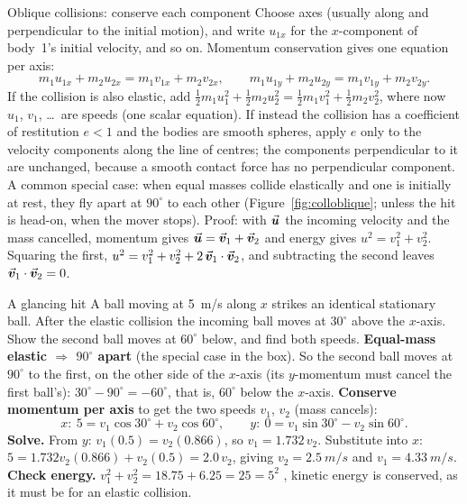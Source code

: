 \begin{methodbox}{Oblique collisions: conserve each component}
Choose axes (usually along and perpendicular to the initial motion), and write $u_{1x}$ for the
$x$-component of body~1's initial velocity, and so on. Momentum conservation gives one equation per axis:
\[
m_1u_{1x}+m_2u_{2x}=m_1v_{1x}+m_2v_{2x},\qquad m_1u_{1y}+m_2u_{2y}=m_1v_{1y}+m_2v_{2y}.
\]
If the collision is also elastic, add $\tfrac12 m_1u_1^2+\tfrac12 m_2u_2^2=\tfrac12 m_1v_1^2+\tfrac12
m_2v_2^2$, where now $u_1$, $v_1$, \dots\ are speeds (one scalar equation). If instead the collision has a coefficient of restitution $e<1$ and the bodies are smooth
spheres, apply $e$ only to the velocity components along the line of centres; the components perpendicular
to it are unchanged, because a smooth contact force has no perpendicular component. A common special case: when equal masses collide elastically and one is initially at rest,
they fly apart at \textbf{$90^\circ$} to each other (Figure~\ref{fig:colloblique}; unless the hit is head-on, when the mover stops).
Proof: with $\vec{\bm{u}}$ the incoming velocity and the mass cancelled, momentum gives $\vec{\bm{u}}=\vec{\bm{v}}_1+\vec{\bm{v}}_2$ and
energy gives $u^2=v_1^2+v_2^2$.
Squaring the first, $u^2=v_1^2+v_2^2+2\,\vec{\bm{v}}_1\cdot\vec{\bm{v}}_2$, and subtracting the second leaves
$\vec{\bm{v}}_1\cdot\vec{\bm{v}}_2=0$.
\end{methodbox}

\begin{exbox}{A glancing hit}
A ball moving at \SI{5}{m/s} along $x$ strikes an identical stationary ball. After the elastic collision
the incoming ball moves at $30^\circ$ above the $x$-axis. Show the second ball moves at $60^\circ$ below,
and find both speeds.
 \textbf{Equal-mass elastic $\Rightarrow$ $90^\circ$ apart} (the special case in the box). So the
second ball moves at $90^\circ$ to the first, on the other side of the $x$-axis (its $y$-momentum must
cancel the first ball's): $30^\circ-90^\circ=-60^\circ$, that is, $60^\circ$ below the $x$-axis.
 \textbf{Conserve momentum per axis} to get the two speeds $v_1$, $v_2$ (mass cancels):
\[
x:\ 5=v_1\cos30^\circ+v_2\cos60^\circ,\qquad
y:\ 0=v_1\sin30^\circ-v_2\sin60^\circ.
\]
 \textbf{Solve.} From $y$: $v_1(0.5)=v_2(0.866)$, so $v_1=1.732\,v_2$. Substitute into $x$:
$5=1.732v_2(0.866)+v_2(0.5)=2.0\,v_2$, giving $v_2=\SI{2.5}{m/s}$ and $v_1=\SI{4.33}{m/s}$.
 \textbf{Check energy.} $v_1^2+v_2^2=18.75+6.25=25=5^2$ \checkmark, kinetic energy is
conserved, as it must be for an elastic collision. 
\end{exbox}


